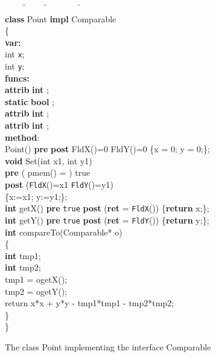 \documentclass[fleqn]{llncs}
\begin{document}
\begin{figure}
\begin{center}
\begin{boxedminipage}{1.0\textwidth}
{\scriptsize
\begin{tabbing}
\ \ \ \ \=\ \ \ \ \ \=\ \ \ \ \ \ \ \ \=\ \ \ \ \=\\
\textbf{class} Point \textbf{impl} Comparable\\
\{\\
\textbf{var:}\\
    \>int \texttt{x};\\
    \>int \texttt{y};\\
\textbf{funcs:}\\
    \>\textbf{attrib} \textbf{int} ;\\
    \>\textbf{static} \textbf{bool} ;\\
    \>\textbf{attrib} \textbf{int} ;\\
    \>\textbf{attrib} \textbf{int} ;\\
\textbf{method}:\\
    \>Point() \textbf{pre}  \textbf{post}  FldX()=0  FldY()=0 \{x = 0; y = 0;\};\\
    \>\textbf{void} Set(int x1, int y1)\\
    \>  \>\textbf{pre}   (  pmem() = )  true\\
    \>  \>\textbf{post}   (\texttt{FldX}()=x1  \texttt{FldY}()=y1)\\
    \>  \>\{x:=x1; y:=y1;\};\\
    \>\textbf{int}  getX()  \textbf{pre}   \texttt{true} \textbf{post}   (\textbf{ret} = \texttt{FldX}()) \{\textbf{return} x;\};\\
    \>\textbf{int}  getY() \textbf{pre}   \texttt{true} \textbf{post}   (\textbf{ret} = \texttt{FldY}()) \{\textbf{return} y;\};\\
    \>\textbf{int} compareTo(Comparable* o)\\
\>  \>\{\\
    \>  \>    \>\textbf{int} tmp1;\\
    \>  \>    \>\textbf{int} tmp2;\\
    \>  \>  \>tmp1 = ogetX();\\
    \>  \>    \>tmp2 = ogetY();\\
    \>  \>    \>return x*x + y*y - tmp1*tmp1 - tmp2*tmp2;\\
    \>  \>\}\\
\}\\
\end{tabbing}
}
\end{boxedminipage}
\end{center}
\caption{The class Point implementing the interface Comparable}\label{FIG-IMPLEMENTATION}
\end{figure}
\end{document}
